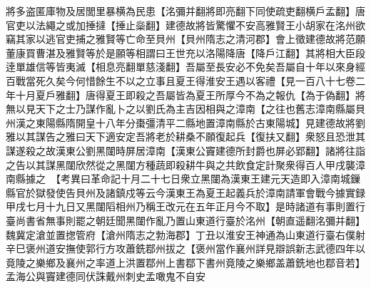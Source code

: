將多盗匿庫物及居閭里暴横為民患【洺彌并翻將即亮翻下同使疏吏翻横戶孟翻】唐官吏以法繩之或加捶撻【捶止橤翻】建德故將皆驚懼不安高雅賢王小胡家在洺州欲竊其家以逃官吏捕之雅賢等亡命至貝州【貝州隋志之清河郡】會上徵建德故將范願董康買曹湛及雅賢等於是願等相謂曰王世充以洛陽降唐【降戶江翻】其將相大臣段逹單雄信等皆夷滅【相息亮翻單慈淺翻】吾屬至長安必不免矣吾屬自十年以來身經百戰當死久矣今何惜餘生不以之立事且夏王得淮安王遇以客禮【見一百八十七卷二年十月夏戶雅翻】唐得夏王即殺之吾屬皆為夏王所厚今不為之報仇【為于偽翻】將無以見天下之士乃謀作亂卜之以劉氏為主吉因相與之漳南【之往也舊志漳南縣屬貝州漢之東陽縣隋開皇十八年分棗彊清平二縣地置漳南縣於古東陽城】見建德故將劉雅以其謀告之雅曰天下適安定吾將老於耕桑不願復起兵【復扶又翻】衆怒且恐泄其謀遂殺之故漢東公劉黑闥時屏居漳南【漢東公竇建德所封爵也屏必郢翻】諸將往詣之告以其謀黑闥欣然從之黑闥方種蔬即殺耕牛與之共飲食定計聚衆得百人甲戌襲漳南縣據之　【考異曰革命記十月二十七日衆立黑闥為漢東王建元天造即入漳南城鏁縣官於獄發使告貝州及諸鎮戍等云今漢東王為夏王起義兵於漳南請軍會戰今據實録甲戌七月十九日又黑闥䧟相州乃稱王改元在五年正月今不取】是時諸道有事則置行臺尚書省無事則罷之朝廷聞黑闥作亂乃置山東道行臺於洺州【朝直遥翻洺彌并翻】魏冀定滄並置揔管府【滄州隋志之勃海郡】丁丑以淮安王神通為山東道行臺右僕射　辛巳褒州道安撫使郭行方攻蕭銑鄀州拔之【褒州當作襄州詳見辯誤新志武德四年以竟陵之樂鄉及襄州之率道上洪置鄀州上書鄀下書州竟陵之樂鄉盖蕭銑地也鄀音若】孟海公與竇建德同伏誅戴州刺史孟噉鬼不自安

